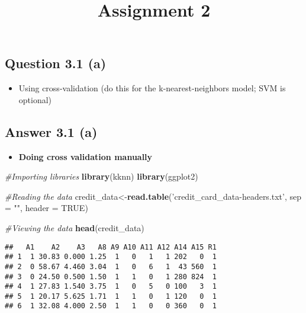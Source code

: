 \documentclass[
]{article}
\title{Assignment 2}
\author{}
\date{\vspace{-2.5em}}
\newenvironment{Shaded}{\begin{snugshade}}{\end{snugshade}}
\newcommand{\CommentTok}[1]{\textcolor[rgb]{0.56,0.35,0.01}{\textit{#1}}}
\newcommand{\DataTypeTok}[1]{\textcolor[rgb]{0.13,0.29,0.53}{#1}}
\newcommand{\KeywordTok}[1]{\textcolor[rgb]{0.13,0.29,0.53}{\textbf{#1}}}
\newcommand{\NormalTok}[1]{#1}
\newcommand{\OtherTok}[1]{\textcolor[rgb]{0.56,0.35,0.01}{#1}}
\newcommand{\StringTok}[1]{\textcolor[rgb]{0.31,0.60,0.02}{#1}}
\providecommand{\tightlist}{%
  \setlength{\itemsep}{0pt}\setlength{\parskip}{0pt}}
\begin{document}
\maketitle

\hypertarget{question-3.1-a}{%
\subsection{Question 3.1 (a)}\label{question-3.1-a}}

\begin{itemize}
\tightlist
\item
  Using cross-validation (do this for the k-nearest-neighbors model; SVM
  is optional)
\end{itemize}

\hypertarget{answer-3.1-a}{%
\subsection{Answer 3.1 (a)}\label{answer-3.1-a}}

\begin{itemize}
\tightlist
\item
  \textbf{Doing cross validation manually}
\end{itemize}

\begin{Shaded}
\begin{Highlighting}[]
\CommentTok{#Importing libraries }
\KeywordTok{library}\NormalTok{(kknn)}
\KeywordTok{library}\NormalTok{(ggplot2)}

\CommentTok{#Reading the data}
\NormalTok{credit_data<-}\KeywordTok{read.table}\NormalTok{(}\StringTok{'credit_card_data-headers.txt'}\NormalTok{, }\DataTypeTok{sep =} \StringTok{""}\NormalTok{, }\DataTypeTok{header =} \OtherTok{TRUE}\NormalTok{)}

\CommentTok{#Viewing the data}
\KeywordTok{head}\NormalTok{(credit_data)}
\end{Highlighting}
\end{Shaded}

\begin{verbatim}
##   A1    A2    A3   A8 A9 A10 A11 A12 A14 A15 R1
## 1  1 30.83 0.000 1.25  1   0   1   1 202   0  1
## 2  0 58.67 4.460 3.04  1   0   6   1  43 560  1
## 3  0 24.50 0.500 1.50  1   1   0   1 280 824  1
## 4  1 27.83 1.540 3.75  1   0   5   0 100   3  1
## 5  1 20.17 5.625 1.71  1   1   0   1 120   0  1
## 6  1 32.08 4.000 2.50  1   1   0   0 360   0  1
\end{verbatim}
\end{document}
